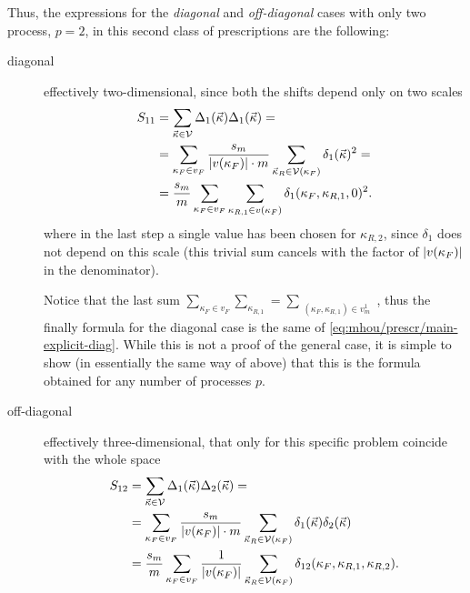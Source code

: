 Thus, the expressions for the \textit{diagonal} and \textit{off-diagonal} cases
with only two process, $p = 2$, in this second class of prescriptions are the
following:
\begin{description}
    \item[diagonal] effectively two-dimensional, since both the shifts depend only on two scales
        \begin{align}
            S_{11} &= \sum_{\vec{\kappa} \in \mathcal{V}} \Delta_1(\vec{\kappa}) \Delta_1(\vec{\kappa}) =\\
                   &= \sum_{\kappa_F \in v_F} \frac{s_m}{\abs{v(\kappa_F)} \cdot m} \sum_{\vec{\kappa}_R \in \mathcal{V}(\kappa_F)}\delta_1(\vec{\kappa})^2 =\\
                   &= \frac{s_m}{m} \sum_{\kappa_F \in v_F} \sum_{\kappa_{R,1} \in v(\kappa_F) } \delta_1(\kappa_F, \kappa_{R, 1}, 0)^2
            \label{eq:mhou/prescr/slices-explicit-diag}.
        \end{align}
        where in the last step a single value has been chosen for $\kappa_{R,
        2}$, since $\delta_1$ does not depend on this scale (this trivial sum
        cancels with the factor of $\abs{v(\kappa_F)}$ in the denominator).

        Notice that the last sum $\sum_{\kappa_F \in v_F} \sum_{\kappa_{R,1}} =
        \sum_{\substack{(\kappa_F, \kappa_{R,1}) \in v_m^1 }}$, thus the
        finally formula for the diagonal case is the same of
        \cref{eq:mhou/prescr/main-explicit-diag}.
        While this is not a proof of the general case, it is simple to show (in
        essentially the same way of above) that this is the formula obtained for
        any number of processes $p$.
    \item[off-diagonal] effectively three-dimensional, that only for this
        specific problem coincide with the whole space
        \begin{align}
            S_{12} &= \sum_{\vec{\kappa} \in \mathcal{V}} \Delta_1(\vec{\kappa}) \Delta_2(\vec{\kappa}) =\\
                   &= \sum_{\kappa_F \in v_F} \frac{s_m}{\abs{v(\kappa_F)} \cdot m} \sum_{\vec{\kappa}_R \in \mathcal{V}(\kappa_F)}\delta_1(\vec{\kappa})\delta_2(\vec{\kappa})\\
                   &= \frac{s_m}{m} \sum_{\kappa_F \in v_F} \frac{1}{\abs{v(\kappa_F)}} \sum_{\vec{\kappa}_R \in \mathcal{V}(\kappa_F)}\delta_{12}(\kappa_F, \kappa_{R,1}, \kappa_{R,2})
            \label{eq:mhou/prescr/slices-explicit-off-diag}.
        \end{align}
\end{description}

